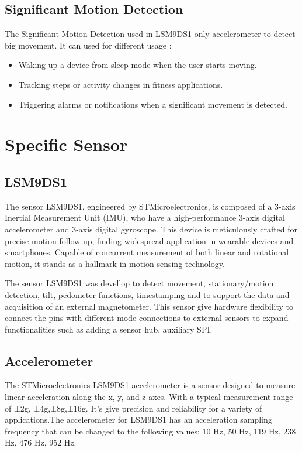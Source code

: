 \subsection{Significant Motion Detection}

The Significant Motion Detection used in LSM9DS1 only accelerometer to detect big movement. It can used for different usage : 
\begin{itemize}
    \item Waking up a device from sleep mode when the user starts moving.
    \item Tracking steps or activity changes in fitness applications.
    \item Triggering alarms or notifications when a significant movement is detected.
\end{itemize}

\section{Specific Sensor }
\subsection{LSM9DS1}

The sensor LSM9DS1, engineered by STMicroelectronics, is composed of a 3-axis Inertial Measurement Unit (IMU), who have a high-performance 3-axis digital accelerometer and 3-axis digital gyroscope. This device is meticulously crafted for precise motion follow up, finding widespread application in wearable devices and smartphones. Capable of concurrent measurement of both linear and rotational motion, it stands as a hallmark in motion-sensing technology.

The sensor LSM9DS1 was devellop to detect movement, stationary/motion detection, tilt, pedometer functions, timestamping and to support the data and acquisition of an external magnetometer. This sensor give hardware flexibility to connect the pins with different mode connections to external sensors to expand functionalities such as adding a sensor hub, auxiliary SPI.

\bigskip

\subsection{Accelerometer}

The STMicroelectronics LSM9DS1 accelerometer is a  sensor designed to measure linear acceleration along the x, y, and z-axes. With a typical measurement range of ±2g, ±4g,±8g,±16g. It's give  precision and reliability for a variety of applications.The accelerometer for LSM9DS1  has an acceleration sampling frequency that can be changed to the following values: 10 Hz, 50 Hz, 119 Hz, 238 Hz, 476 Hz, 952 Hz.

